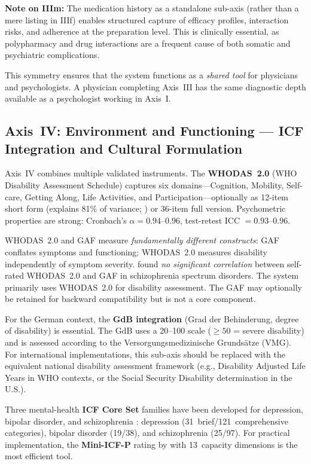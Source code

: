\documentclass[11pt,a4paper]{article}
\begin{document}
\textbf{Note on IIIm:} The medication history as a standalone sub-axis (rather than a mere listing in IIIf) enables structured capture of efficacy profiles, interaction risks, and adherence at the preparation level. This is clinically essential, as polypharmacy and drug interactions are a frequent cause of both somatic and psychiatric complications.

This symmetry ensures that the system functions as a \textit{shared tool} for physicians and psychologists. A physician completing Axis~III has the same diagnostic depth available as a psychologist working in Axis~I.

\subsection{Axis~IV: Environment and Functioning --- ICF Integration and Cultural Formulation}
\label{sec:axis4}

Axis~IV combines multiple validated instruments. The \textbf{WHODAS~2.0} \citep{WHO2010} (WHO Disability Assessment Schedule) captures six domains---Cognition, Mobility, Self-care, Getting Along, Life Activities, and Participation---optionally as 12-item short form (explains 81\% of variance; \citealp{Luciano2010}) or 36-item full version. Psychometric properties are strong: Cronbach's $\alpha = 0.94$--$0.96$, test-retest ICC $= 0.93$--$0.96$.

WHODAS~2.0 and GAF measure \textit{fundamentally different constructs}: GAF conflates symptoms and functioning; WHODAS~2.0 measures disability independently of symptom severity. \citet{Gspandl2018} found \textit{no significant correlation} between self-rated WHODAS~2.0 and GAF in schizophrenia spectrum disorders. The system primarily uses WHODAS~2.0 for disability assessment. The GAF may optionally be retained for backward compatibility but is not a core component.

For the German context, the \textbf{GdB integration} (Grad der Behinderung, degree of disability) is essential. The GdB uses a 20--100 scale ($\geq 50$ = severe disability) and is assessed according to the Versorgungsmedizinische Grunds\"atze (VMG). For international implementations, this sub-axis should be replaced with the equivalent national disability assessment framework (e.g., Disability Adjusted Life Years in WHO contexts, or the Social Security Disability determination in the U.S.).

Three mental-health \textbf{ICF Core Set} families have been developed for depression, bipolar disorder, and schizophrenia \citep{Cieza2004Depression, AyusoMateos2013Bipolar, GomezBenito2018Schizophrenia}: depression (31~brief/121~comprehensive categories), bipolar disorder (19/38), and schizophrenia (25/97). For practical implementation, the \textbf{Mini-ICF-P} rating by \citet{LindenBaron2005} with 13~capacity dimensions is the most efficient tool.
\end{document}
